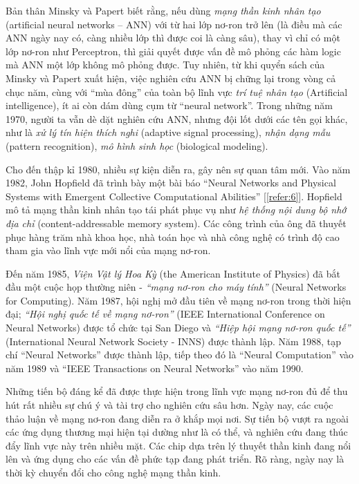 Bản thân Minsky và Papert biết rằng, nếu dùng \textit{mạng thần kinh nhân tạo} (artificial neural networks – ANN) với từ hai lớp nơ-ron trở lên (là điều mà các ANN ngày nay có, càng nhiều lớp thì được coi là càng sâu), thay vì chỉ có một lớp nơ-ron như Perceptron, thì giải quyết được vấn đề mô phỏng các hàm logic mà ANN một lớp không mô phỏng được. Tuy nhiên, từ khi quyển sách của Minsky và Papert xuất hiện, việc nghiên cứu ANN bị chững lại trong vòng cả chục năm, cùng với ``mùa đông'' của toàn bộ lĩnh vực \textit{trí tuệ nhân tạo} (Artificial intelligence), ít ai còn dám dùng cụm từ “neural network”. Trong những năm 1970, người ta vẫn dè dặt nghiên cứu ANN, nhưng đội lốt dưới các tên gọi khác, như là \textit{xử lý tín hiện thích nghi} (adaptive signal processing), \textit{nhận dạng 
mẫu} (pattern recognition), \textit{mô hình sinh học} (biological modeling).

Cho đến thập kỉ 1980, nhiều sự kiện diễn ra, gây nên sự quan tâm mới.
Vào năm 1982, John Hopfield đã trình bày một bài báo ``Neural Networks and Physical Systems with Emergent Collective Computational Abilities'' [\ref{refer:6}]. Hopfield mô tả mạng thần kinh nhân tạo tái phát phục vụ như \textit{hệ thống nội dung bộ nhớ địa chỉ} (content-addressable memory system). Các công trình của ông đã thuyết phục hàng trăm nhà khoa học, nhà toán học và nhà công nghệ có trình độ cao tham gia vào lĩnh vực mới nổi của mạng nơ-ron.

Đến năm 1985, \textit{Viện Vật lý Hoa Kỳ} (the American Institute of Physics) đã bắt đầu một cuộc họp thường niên - \textit{``mạng nơ-ron cho máy tính''} (Neural Networks for Computing). Năm 1987, hội nghị mở đầu tiên về mạng nơ-ron trong thời hiện đại; \textit{``Hội nghị quốc tế về mạng nơ-ron''} (IEEE International Conference on Neural Networks) được tổ chức tại San Diego và \textit{``Hiệp hội mạng nơ-ron quốc tế''} (International Neural Network Society - INNS) được thành lập. Năm 1988, tạp chí ``Neural Networks'' được thành lập, tiếp theo đó là ``Neural Computation'' vào năm 1989 và ``IEEE Transactions on Neural Networks'' vào năm 1990.

Những tiến bộ đáng kể đã được thực hiện trong lĩnh vực mạng nơ-ron đủ để thu hút rất nhiều sự chú ý và tài trợ cho nghiên cứu sâu hơn. Ngày nay, các cuộc thảo luận về mạng nơ-ron đang diễn ra ở khắp mọi nơi. Sự tiến bộ vượt ra ngoài các ứng dụng thương mại hiện tại dường như là có thể, và nghiên cứu đang thúc đẩy lĩnh vực này trên nhiều mặt. Các chip dựa trên lý thuyết thần kinh đang nổi lên và ứng dụng cho các vấn đề phức tạp đang phát triển. Rõ ràng, ngày nay là thời kỳ chuyển đổi cho công nghệ mạng thần kinh.

